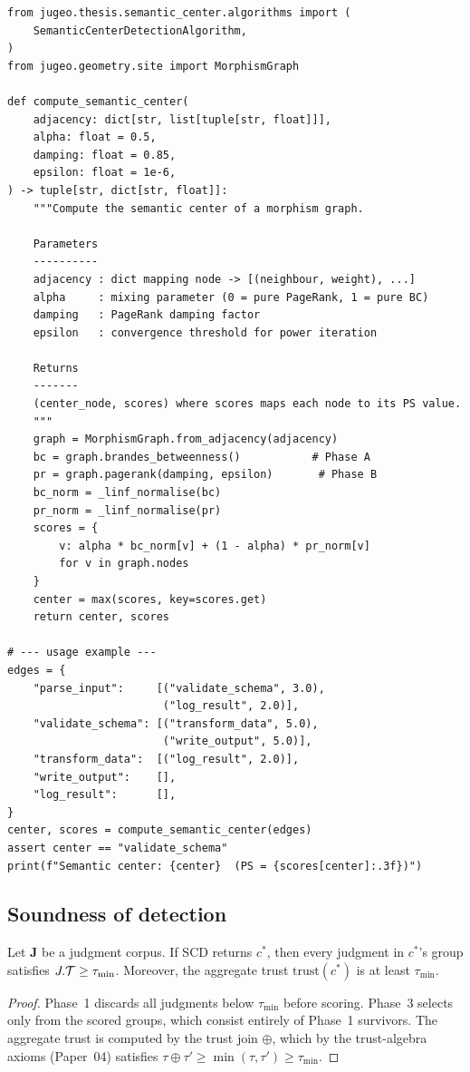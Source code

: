\documentclass[11pt]{article}
\newcommand{\SCD}{\textsc{SCD}}             %
\begin{document}
\begin{lstlisting}[style=jugeo-python,
    caption={Public API: computing the semantic center of a morphism graph},
    label={lst:api-center}]
from jugeo.thesis.semantic_center.algorithms import (
    SemanticCenterDetectionAlgorithm,
)
from jugeo.geometry.site import MorphismGraph

def compute_semantic_center(
    adjacency: dict[str, list[tuple[str, float]]],
    alpha: float = 0.5,
    damping: float = 0.85,
    epsilon: float = 1e-6,
) -> tuple[str, dict[str, float]]:
    """Compute the semantic center of a morphism graph.

    Parameters
    ----------
    adjacency : dict mapping node -> [(neighbour, weight), ...]
    alpha     : mixing parameter (0 = pure PageRank, 1 = pure BC)
    damping   : PageRank damping factor
    epsilon   : convergence threshold for power iteration

    Returns
    -------
    (center_node, scores) where scores maps each node to its PS value.
    """
    graph = MorphismGraph.from_adjacency(adjacency)
    bc = graph.brandes_betweenness()           # Phase A
    pr = graph.pagerank(damping, epsilon)       # Phase B
    bc_norm = _linf_normalise(bc)
    pr_norm = _linf_normalise(pr)
    scores = {
        v: alpha * bc_norm[v] + (1 - alpha) * pr_norm[v]
        for v in graph.nodes
    }
    center = max(scores, key=scores.get)
    return center, scores

# --- usage example ---
edges = {
    "parse_input":     [("validate_schema", 3.0),
                        ("log_result", 2.0)],
    "validate_schema": [("transform_data", 5.0),
                        ("write_output", 5.0)],
    "transform_data":  [("log_result", 2.0)],
    "write_output":    [],
    "log_result":      [],
}
center, scores = compute_semantic_center(edges)
assert center == "validate_schema"
print(f"Semantic center: {center}  (PS = {scores[center]:.3f})")
\end{lstlisting}

\subsection{Soundness of detection}

\begin{theorem}\label{thm:detection-sound}
Let $\mathbf{J}$ be a judgment corpus.  If \SCD{} returns $c^*$, then
every judgment in $c^*$'s group satisfies $J.\mathcal{T} \geq \tau_{\min}$.
Moreover, the aggregate trust $\mathrm{trust}(c^*)$ is at least
$\tau_{\min}$.
\end{theorem}
\begin{proof}
Phase~1 discards all judgments below $\tau_{\min}$ before scoring.
Phase~3 selects only from the scored groups, which consist entirely of
Phase~1 survivors.  The aggregate trust is computed by the trust join
$\oplus$, which by the trust-algebra axioms (Paper~04) satisfies
$\tau \oplus \tau' \geq \min(\tau, \tau') \geq \tau_{\min}$.
\end{proof}
\end{document}
